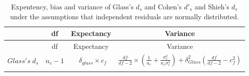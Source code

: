 \documentclass[
  man,floatsintext]{apa6}
\begin{document}
\newpage
\begin{landscape}

\begin{longtable}[]{@{}lccc@{}}
\caption{Expentency, bias and variance of Glass's \(d_s\) and Cohen's \(d'_s\) and Shieh's \(d_s\) under the assumptions that independent residuals are normally distributed.}\tabularnewline
\toprule
\begin{minipage}[b]{0.10\columnwidth}\raggedright
\strut
\end{minipage} & \begin{minipage}[b]{0.18\columnwidth}\centering
df\strut
\end{minipage} & \begin{minipage}[b]{0.16\columnwidth}\centering
Expectancy\strut
\end{minipage} & \begin{minipage}[b]{0.45\columnwidth}\centering
Variance\strut
\end{minipage}\tabularnewline
\midrule
\endfirsthead
\toprule
\begin{minipage}[b]{0.10\columnwidth}\raggedright
\strut
\end{minipage} & \begin{minipage}[b]{0.18\columnwidth}\centering
df\strut
\end{minipage} & \begin{minipage}[b]{0.16\columnwidth}\centering
Expectancy\strut
\end{minipage} & \begin{minipage}[b]{0.45\columnwidth}\centering
Variance\strut
\end{minipage}\tabularnewline
\midrule
\endhead
\begin{minipage}[t]{0.10\columnwidth}\raggedright
\(Glass's \; d_s\)\strut
\end{minipage} & \begin{minipage}[t]{0.18\columnwidth}\centering
\(n_c-1\)\strut
\end{minipage} & \begin{minipage}[t]{0.16\columnwidth}\centering
~\(\delta_{glass} \times c_f\)\strut
\end{minipage} & \begin{minipage}[t]{0.45\columnwidth}\centering
\(\frac{df}{df-2} \times \left( \frac{1}{n_c} + \frac{\sigma^2_e}{n_e\sigma^2_c}\right) + \delta^2_{Glass} \left( \frac{df}{df-2} - c_f^2 \right)\)\strut
\end{minipage}\tabularnewline
\begin{minipage}[t]{0.10\columnwidth}\raggedright

\end{minipage}
\end{longtable}
\end{landscape}
\end{document}
